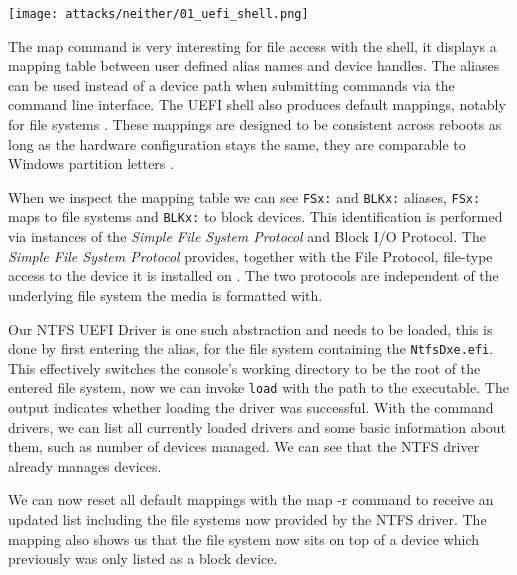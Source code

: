 \texttt{[image: attacks/neither/01\_uefi\_shell.png]}


The map command is very interesting for file access with the shell, it displays a mapping table between user defined alias names and device handles. The aliases can be used instead of a device path when submitting commands via the command line interface. The \ac{UEFI} shell also produces default mappings, notably for file systems \cite[3.7.2. Mappings]{uefi-shell-spec}. These mappings are designed to be consistent across reboots as long as the hardware configuration stays the same, they are comparable to Windows partition letters \cite[Appendix A]{uefi-shell-spec}.

When we inspect the mapping table we can see \lstinline{FSx:} and \lstinline{BLKx:} aliases, \lstinline{FSx:} maps to file systems and \lstinline{BLKx:} to block devices. This identification is performed via instances of the \emph{Simple File System Protocol} and  Block I/O Protocol.
The \emph{Simple File System Protocol} \cite[13.4 Simple File System Protocol]{uefi-spec} provides, together with the File Protocol, file-type access to the device it is installed on \cite[13.5 File Protocol]{uefi-spec}. The two protocols are independent of the underlying file system the media is formatted with.


Our \ac{NTFS} \ac{UEFI} Driver is one such abstraction and needs to be loaded, this is done by first entering the alias, for the file system containing the \lstinline{NtfsDxe.efi}.
This effectively switches the console's working directory to be the root of the entered file system, now we can invoke \lstinline{load} with the path to the executable. The output indicates whether loading the driver was successful.
With the command drivers, we can list all currently loaded drivers and some basic information about them, such as number of devices managed. We can see that the NTFS driver already manages devices.

We can now reset all default mappings with the map -r command to receive an updated list including the file systems now provided by the \ac{NTFS} driver. The mapping also shows us that the file system now sits on top of a device which previously was only listed as a block device.

